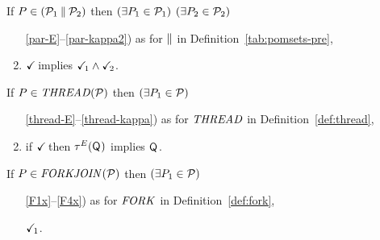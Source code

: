 


\begin{definition}$\phantom{\;}$\par

  \noindent
  If $\aPS\SB0 \in (\aPSS_1\sPAR\aPSS_2)$ then
  $(\exists\aPS_1\in\aPSS_1)$ $(\exists\aPS_2\in\aPSS_2)$
  \begin{enumerate}
    \setcounter{enumi}{\value{pomsetPreParCount}}
  \item[\ref{par-E}--\ref{par-kappa2})]
    as for $\sPAR$ in Definition~\ref{tab:pomsets-pre},
  \item \label{par-tick}
    $\TICK$ implies $\TICK_1\land\TICK_2$.
  \end{enumerate}

  \noindent
  If $\aPS\SB0 \in \sTHREAD{\aPSS}$ then
  $(\exists\aPS_1\in\aPSS)$
  \begin{enumerate}
    \setcounter{enumi}{\value{pomsetXThreadCount}}
  \item[\ref{thread-E}--\ref{thread-kappa})]
    as for $\sTHREAD{}$ in Definition~\ref{def:thread},
  \item if $\TICK$ then $\aTr[\aEvs](\Q{})$ implies $\Q{}$.
  \end{enumerate}    

  \noindent
  If $\aPS\SB0 \in \sFORKJOIN{\aPSS}$ then
  $(\exists\aPS_1\in\aPSS)$
  \begin{enumerate}
    \setcounter{enumi}{\value{pomsetXForkCount}}
  \item[\ref{F1x}--\ref{F4x})]
    as for $\sFORK{}$ in Definition~\ref{def:fork},
  \item[{\labeltext[F5]{F5)}{F5}}]
    $\TICK_1$.
  \end{enumerate}    
\end{definition}

